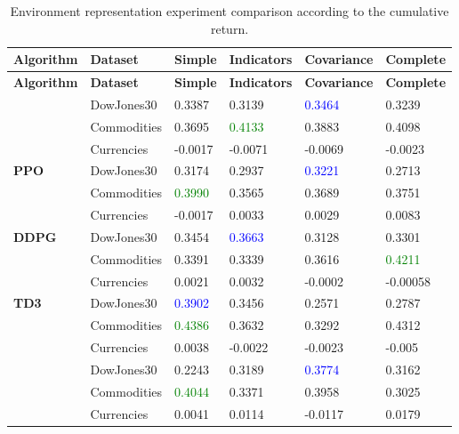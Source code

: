 \begin{longtable}{|p{2cm}|p{2.2cm}|p{2cm}|p{2cm}|p{2.2cm}|p{2cm}|}
    \hline
    \textbf{Algorithm} & \textbf{Dataset} & \textbf{Simple} & \textbf{Indicators} & \textbf{Covariance} & \textbf{Complete} \\ \midrule
    \endfirsthead

    \hline
    \textbf{Algorithm} & \textbf{Dataset} & \textbf{Simple} & \textbf{Indicators} & \textbf{Covariance} & \textbf{Complete}  \\ \midrule
    \endhead

    \caption{Environment representation experiment comparison according to the cumulative return.}
    \label{tab:experiment_environment_cumulative}

    \endfoot

    \hline  
    \multirow{3}{*}{\textbf{A2C}}
    & DowJones30 & 0.3387 & 0.3139 & \textcolor{blue}{0.3464} & 0.3239 \\ \cline{2-6}
    & Commodities & 0.3695 & \textcolor{green}{0.4133} & 0.3883 & 0.4098 \\ \cline{2-6}
    & Currencies & -0.0017 & -0.0071 & -0.0069 & -0.0023 \\ \midrule

    \multirow{3}{*}{\textbf{PPO}}
    & DowJones30 & 0.3174 & 0.2937 & \textcolor{blue}{0.3221} & 0.2713 \\ \cline{2-6}
    & Commodities & \textcolor{green}{0.3990} & 0.3565 & 0.3689 & 0.3751 \\ \cline{2-6}
    & Currencies & -0.0017 & 0.0033 & 0.0029 & 0.0083 \\ \midrule

    \multirow{3}{*}{\textbf{DDPG}}
    & DowJones30 & 0.3454 & \textcolor{blue}{0.3663} & 0.3128 & 0.3301 \\ \cline{2-6}
    & Commodities & 0.3391 & 0.3339 & 0.3616 & \textcolor{green}{0.4211} \\ \cline{2-6}
    & Currencies & 0.0021 & 0.0032 & -0.0002 & -0.00058 \\ \midrule

    \multirow{3}{*}{\textbf{TD3}}
    & DowJones30 & \textcolor{blue}{0.3902} & 0.3456 & 0.2571 & 0.2787 \\ \cline{2-6}
    & Commodities & \textcolor{green}{0.4386} & 0.3632 & 0.3292 & 0.4312 \\ \cline{2-6}
    & Currencies & 0.0038 & -0.0022 & -0.0023 & -0.005 \\ \midrule
    \pagebreak

    \multirow{3}{*}{\textbf{SAC}}
    & DowJones30 & 0.2243 & 0.3189 & \textcolor{blue}{0.3774} & 0.3162 \\ \cline{2-6}
    & Commodities & \textcolor{green}{0.4044} & 0.3371 & 0.3958 & 0.3025 \\ \cline{2-6}
    & Currencies & 0.0041 & 0.0114 & -0.0117 & 0.0179 \\ \midrule
\end{longtable}